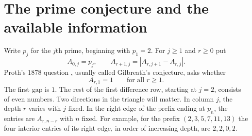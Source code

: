 \documentclass[11pt,a4paper]{article}
\begin{document}
\thispagestyle{plain}
\par
\vspace{0.65em}
\par
\vspace{0.5em}
\par
\vspace{0.35em}
\par
\vspace{0.7em}
\begin{abstract}
For the triangle of iterated absolute differences of consecutive primes, the greatest common divisor of every tail of the western edge is one. On every fixed interior column, even after sampling depths at multiples of any fixed power of two, the two residues zero and two modulo four both recur infinitely often. The associated binary series is transcendental over the rational function field of characteristic two. Along the moving right edge of the first $n$ primes, the number of entries in each of those residue classes tends to infinity. For the number $N_n$ of length-$n$ Gilbreath prefixes we prove $\log N_n=\Theta(n^2)$. We also give a binomial parity criterion and a constructive solution to the small-width right-edge realization question for finite Gilbreath prefixes. Finally, a separate constant-edge conjecture of Kimberling for primes in arithmetic progressions admits a counterexample at modulus seven and fails at the first difference for a density-one set of odd moduli. The classical assertion that every positive-depth western entry equals one remains open.
\end{abstract}
\section{The prime conjecture and the available information}
Write $p_j$ for the $j$th prime, beginning with $p_1=2$. For $j\ge1$ and $r\ge0$ put
\[
 A_{0,j}=p_j,\qquad A_{r+1,j}=|A_{r,j+1}-A_{r,j}|.
\]
Proth's 1878 question \cite{proth}, usually called Gilbreath's conjecture, asks whether
\begin{equation}\label{eq:gil}
                         A_{r,1}=1\qquad\text{for all }r\ge1 .
\end{equation}
The first gap is $1$. The rest of the first difference row, starting at $j=2$, consists of even numbers. Two directions in the triangle will matter. In column $j$, the depth $r$ varies with $j$ fixed. In the right edge of the prefix ending at $p_n$, the entries are $A_{r,n-r}$ with $n$ fixed. For example, for the prefix $(2,3,5,7,11,13)$ the four interior entries of its right edge, in order of increasing depth, are $2,2,0,2$.
\end{document}

